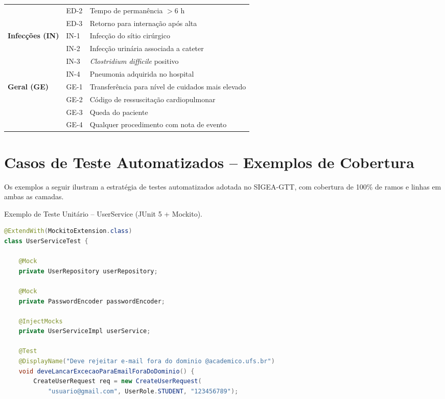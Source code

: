 \begin{apendicesenv}
\begin{quadro}[htb]
\begin{tabularx}{\textwidth}{l l X}
  & ED-2 & Tempo de permanência $> 6$ h \\
  & ED-3 & Retorno para internação após alta \\
\midrule
\multirow{4}{*}{\textbf{Infecções (IN)}}
  & IN-1 & Infecção do sítio cirúrgico \\
  & IN-2 & Infecção urinária associada a cateter \\
  & IN-3 & \textit{Clostridium difficile} positivo \\
  & IN-4 & Pneumonia adquirida no hospital \\
\midrule
\multirow{4}{*}{\textbf{Geral (GE)}}
  & GE-1 & Transferência para nível de cuidados mais elevado \\
  & GE-2 & Código de ressuscitação cardiopulmonar \\
  & GE-3 & Queda do paciente \\
  & GE-4 & Qualquer procedimento com nota de evento \\
\bottomrule
\end{tabularx}
\end{quadro}

\chapter{Casos de Teste Automatizados -- Exemplos de Cobertura}
\label{apend_testes}

Os exemplos a seguir ilustram a estratégia de testes automatizados adotada
no SIGEA-GTT, com cobertura de 100\% de ramos e linhas em ambas as camadas.

\begin{codigo}[htb]
\caption{Exemplo de Teste Unitário -- UserService (JUnit 5 + Mockito).}
\label{cod_teste_user}
\begin{lstlisting}[language=Java]
@ExtendWith(MockitoExtension.class)
class UserServiceTest {

    @Mock
    private UserRepository userRepository;

    @Mock
    private PasswordEncoder passwordEncoder;

    @InjectMocks
    private UserServiceImpl userService;

    @Test
    @DisplayName("Deve rejeitar e-mail fora do dominio @academico.ufs.br")
    void deveLancarExcecaoParaEmailForaDoDominio() {
        CreateUserRequest req = new CreateUserRequest(
            "usuario@gmail.com", UserRole.STUDENT, "123456789");


\end{lstlisting}
\end{codigo}
\end{apendicesenv}
